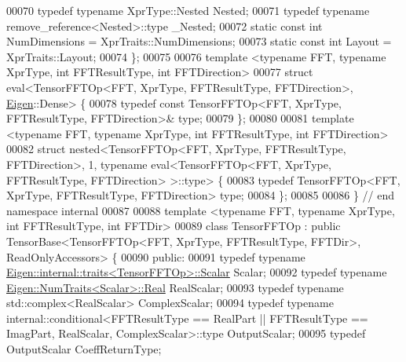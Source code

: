 \begin{DoxyCode}
00070   \textcolor{keyword}{typedef} \textcolor{keyword}{typename} XprType::Nested Nested;
00071   \textcolor{keyword}{typedef} \textcolor{keyword}{typename} remove\_reference<Nested>::type \_Nested;
00072   \textcolor{keyword}{static} \textcolor{keyword}{const} \textcolor{keywordtype}{int} NumDimensions = XprTraits::NumDimensions;
00073   \textcolor{keyword}{static} \textcolor{keyword}{const} \textcolor{keywordtype}{int} Layout = XprTraits::Layout;
00074 \};
00075 
00076 \textcolor{keyword}{template} <\textcolor{keyword}{typename} FFT, \textcolor{keyword}{typename} XprType, \textcolor{keywordtype}{int} FFTResultType, \textcolor{keywordtype}{int} FFTDirection>
00077 \textcolor{keyword}{struct }eval<TensorFFTOp<FFT, XprType, FFTResultType, FFTDirection>, \hyperlink{namespace_eigen}{Eigen}::Dense> \{
00078   \textcolor{keyword}{typedef} \textcolor{keyword}{const} TensorFFTOp<FFT, XprType, FFTResultType, FFTDirection>& type;
00079 \};
00080 
00081 \textcolor{keyword}{template} <\textcolor{keyword}{typename} FFT, \textcolor{keyword}{typename} XprType, \textcolor{keywordtype}{int} FFTResultType, \textcolor{keywordtype}{int} FFTDirection>
00082 \textcolor{keyword}{struct }nested<TensorFFTOp<FFT, XprType, FFTResultType, FFTDirection>, 1, typename eval<TensorFFTOp<FFT, 
      XprType, FFTResultType, FFTDirection> >::type> \{
00083   \textcolor{keyword}{typedef} TensorFFTOp<FFT, XprType, FFTResultType, FFTDirection> type;
00084 \};
00085 
00086 \}  \textcolor{comment}{// end namespace internal}
00087 
00088 \textcolor{keyword}{template} <\textcolor{keyword}{typename} FFT, \textcolor{keyword}{typename} XprType, \textcolor{keywordtype}{int} FFTResultType, \textcolor{keywordtype}{int} FFTDir>
00089 \textcolor{keyword}{class }TensorFFTOp : \textcolor{keyword}{public} TensorBase<TensorFFTOp<FFT, XprType, FFTResultType, FFTDir>, ReadOnlyAccessors>
       \{
00090  \textcolor{keyword}{public}:
00091   \textcolor{keyword}{typedef} \textcolor{keyword}{typename} \hyperlink{struct_eigen_1_1internal_1_1traits}{Eigen::internal::traits<TensorFFTOp>::Scalar}
       Scalar;
00092   \textcolor{keyword}{typedef} \textcolor{keyword}{typename} \hyperlink{group___sparse_core___module}{Eigen::NumTraits<Scalar>::Real} RealScalar;
00093   \textcolor{keyword}{typedef} \textcolor{keyword}{typename} std::complex<RealScalar> ComplexScalar;
00094   \textcolor{keyword}{typedef} \textcolor{keyword}{typename} internal::conditional<FFTResultType == RealPart || FFTResultType == ImagPart,
       RealScalar, ComplexScalar>::type OutputScalar;
00095   \textcolor{keyword}{typedef} OutputScalar CoeffReturnType;

\end{DoxyCode}
